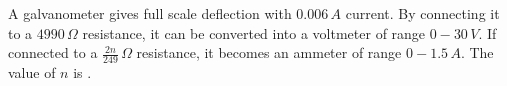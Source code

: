 

    \item A galvanometer gives full scale deflection with \(0.006\, A\) current. By connecting it to a \(4990\, \Omega\) resistance, it can be converted into a voltmeter of range \(0 - 30\, V\). If connected to a \(\frac{2n}{249}\, \Omega\) resistance, it becomes an ammeter of range \(0 - 1.5\, A\). The value of \(n\) is \underline{\hspace{2.5 cm}}.

